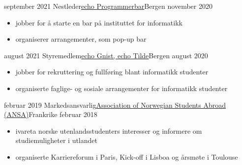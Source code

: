 \begin{experiences}
 \emptySeparator
 
\simpleexperience
    {september 2021}   {Nestleder}{\href{https://echo.uib.no/om-echo/studentgrupper/programmerbar}{echo Programmerbar}}{Bergen}
    {november 2020} {
                      \begin{itemize}
                        \item jobber for å starte en bar på instituttet for informatikk
                        \item organiserer arrangementer, som pop-up bar
                      \end{itemize}
                    }
                    

  \emptySeparator

\simpleexperience
    {august 2021}   {Styremedlem}{\href{https://echo.uib.no/om-echo/studentgrupper}{echo Gnist, echo Tilde}}{Bergen}
    {august 2020} {
                      \begin{itemize}
                      \item  jobber for rekruttering og fullføring blant informatikk studenter 
                        \item  organiserte faglige- og sosiale arrangementer for informatikk studenter
                      \end{itemize}
                    }
                    
  \emptySeparator
  
\simpleexperience
    {februar 2019}   {Markedsansvarlig}{\href{https://www.ansa.no/Om-ANSA/}{Association of Norwegian Students Abroad (ANSA)}}{Frankrike}
    {februar 2018} {
                      \begin{itemize}
                        \item ivareta norske utenlandsstudenters interesser og informere om studiemuligheter i utlandet
                        \item organiserte Karriereforum i Paris, Kick-off i Lisboa og årsmøte i Toulouse
                      \end{itemize}
                    }
                    

  
\end{experiences}
